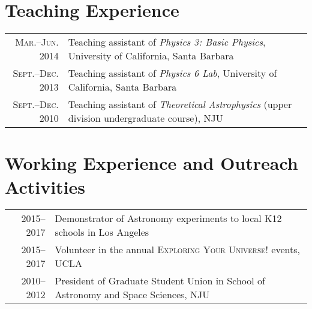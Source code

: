 \documentclass[letterpaper,10pt]{article}
\newcommand{\narrow}{-1.8ex}
\begin{document}
%

\section{Teaching Experience}

\begin{tabular}{rp{5.4in}}
\textsc{\small Mar.--Jun. 2014}  & Teaching assistant of \textit{Physics 3: Basic Physics}, University of California, Santa Barbara \\
\textsc{\small Sept.--Dec. 2013}  & Teaching assistant of \textit{Physics 6 Lab}, University of California, Santa Barbara \\
\textsc{\small Sept.--Dec. 2010}  & Teaching assistant of \textit{Theoretical Astrophysics} (upper division undergraduate course), NJU
\end{tabular}

\section{Working Experience and Outreach Activities}

\begin{tabular}{rp{5.4in}}
\textsc{2015--2017}  & Demonstrator of Astronomy experiments to local K12 schools in Los Angeles    \\
\textsc{2015--2017}  & Volunteer in the annual \textsc{Exploring Your Universe!} events, UCLA   \\
\textsc{2010--2012}  & President of Graduate Student Union in School of Astronomy and Space Sciences, NJU
\end{tabular}
\end{document}
